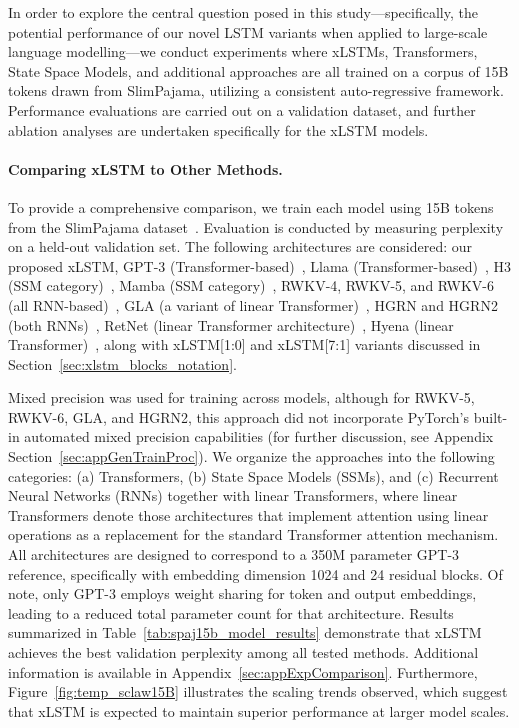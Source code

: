 In order to explore the central question posed in this study—specifically, the potential performance of our novel LSTM variants when applied to large-scale language modelling—we conduct experiments where xLSTMs, Transformers, State Space Models, and additional approaches are all trained on a corpus of 15B tokens drawn from SlimPajama, utilizing a consistent auto-regressive framework. Performance evaluations are carried out on a validation dataset, and further ablation analyses are undertaken specifically for the xLSTM models.

\paragraph{Comparing xLSTM to Other Methods.} To provide a comprehensive comparison, we train each model using 15B tokens from the SlimPajama dataset~\citep{Soboleva:23}. Evaluation is conducted by measuring perplexity on a held-out validation set. The following architectures are considered: our proposed xLSTM, GPT-3 (Transformer-based)~\citep{Brown:20short}, Llama (Transformer-based)~\citep{Touvron:23arxiv}, H3 (SSM category)~\citep{Fu:23}, Mamba (SSM category)~\citep{Gu:24arxiv}, RWKV-4, RWKV-5, and RWKV-6 (all RNN-based)~\citep{Peng:23arxivshort,Peng:24arxivshort}, GLA (a variant of linear Transformer)~\citep{Yang:23arxiv}, HGRN and HGRN2 (both RNNs)~\citep{Qin:23,Qin:24arxiv}, RetNet (linear Transformer architecture)~\citep{Sun:23arxiv}, Hyena (linear Transformer)~\citep{Poli:23}, along with xLSTM[1:0] and xLSTM[7:1] variants discussed in Section~\ref{sec:xlstm_blocks_notation}. 

Mixed precision was used for training across models, although for RWKV-5, RWKV-6, GLA, and HGRN2, this approach did not incorporate PyTorch’s built-in automated mixed precision capabilities (for further discussion, see Appendix Section~\ref{sec:appGenTrainProc}). We organize the approaches into the following categories: (a) Transformers, (b) State Space Models (SSMs), and (c) Recurrent Neural Networks (RNNs) together with linear Transformers, where linear Transformers denote those architectures that implement attention using linear operations as a replacement for the standard Transformer attention mechanism. All architectures are designed to correspond to a 350M parameter GPT-3 reference, specifically with embedding dimension 1024 and 24 residual blocks. Of note, only GPT-3 employs weight sharing for token and output embeddings, leading to a reduced total parameter count for that architecture. Results summarized in Table~\ref{tab:spaj15b_model_results} demonstrate that xLSTM achieves the best validation perplexity among all tested methods. Additional information is available in Appendix~\ref{sec:appExpComparison}. Furthermore, Figure~\ref{fig:temp_sclaw15B} illustrates the scaling trends observed, which suggest that xLSTM is expected to maintain superior performance at larger model scales.

